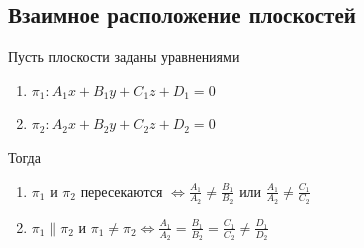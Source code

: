 \documentclass[a4paper]{article}
\begin{document}
\newpage \begin{center}\begin{Large}\end{Large}\end{center}
\subsection*{Взаимное расположение плоскостей}

\begin{htheorem}
Пусть плоскости заданы уравнениями \begin{enumerate}
\item $\pi_1: A_1x+B_1y+C_1z+D_1 = 0$
\item $\pi_2: A_2x+B_2y+C_2z+D_2 = 0$
\end{enumerate}

Тогда\begin{enumerate}
\item $\pi_1$ и $\pi_2$ пересекаются $\displaystyle \Leftrightarrow \frac{A_1}{A_2} \neq \frac{B_1}{B_2}$ или $\displaystyle \frac{A_1}{A_2} \neq \frac{C_1}{C_2}$

\item $\pi_1 \parallel \pi_2$ и $\pi_1 \neq \pi_2 \Leftrightarrow \displaystyle \frac{A_1}{A_2} = \frac{B_1}{B_2} = \frac{C_1}{C_2} \neq \frac{D_1}{D_2}$
\end{enumerate}
\end{htheorem}
\end{document}
